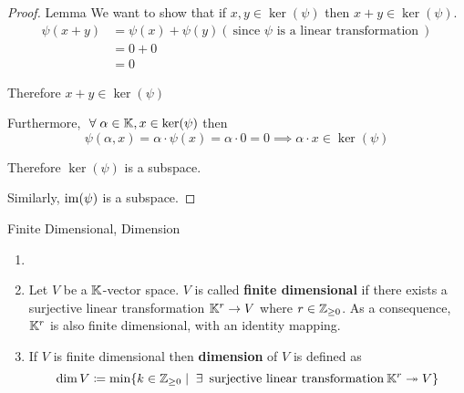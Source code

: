 \begin{proof} {Lemma}    
    We want to show that if \(x, y \in \ker(\psi)\) then \(x + y \in \ker(\psi)\).
    \[
        \begin{split}  
            \psi(x + y) &= \psi(x) + \psi(y) (\:\text{since \(\psi\) is a linear transformation}\: ) \\
            & = 0 + 0 \\
            &= 0
        \end{split}
    \]

    Therefore \(x + y \in \ker(\psi)\)

    Furthermore, \(\forall \alpha \in \bbk, x \in \ker(\psi)\) then \[
    \psi(\alpha, x) = \alpha \cdot \psi(x) = \alpha \cdot 0 = 0 \implies \alpha \cdot x \in \ker(\psi)
    \]

    Therefore \(\ker(\psi)\) is a subspace.

    Similarly, \(\mathrm{im}(\psi)\) is a subspace.
\end{proof}
\begin{definition} {Finite Dimensional, Dimension}
    \begin{enumerate}
        \item[]
        \item Let \(V\) be a \(\mathbb{K}\)-vector space. \(V\) is called \textbf{finite dimensional} if there exists a surjective linear transformation \(\mathbb{K}^r \to V\) where \(r \in \mathbb{Z}_{\geq 0}\). As a consequence, \(\mathbb{K}^r\) is also finite dimensional, with an identity mapping.
        \item If $V$ is finite dimensional then \textbf{dimension} of $V$ is defined as \[\dim V \coloneqq \min\{k \in \bbz_{\geq 0} \mid \exists \:\text{surjective linear transformation}\: \bbk^r \twoheadrightarrow  V\}\]
    \end{enumerate}
\end{definition}
